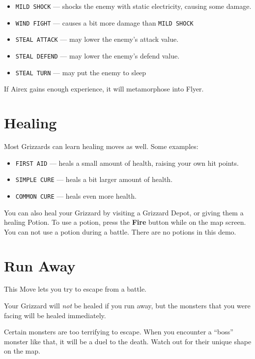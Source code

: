 \documentclass[10pt,twocolumn,openany,article]{memoir}
\begin{document}
\begin{itemize}
\item \texttt{MILD SHOCK} --- shocks  the enemy with static electricity,
  causing some damage.
\item \texttt{WIND FIGHT} --- causes a bit more damage than \texttt{MILD SHOCK}
\item \texttt{STEAL ATTACK} --- may lower the enemy's attack value.
\item \texttt{STEAL DEFEND} --- may lower the enemy's defend value.
\item \texttt{STEAL TURN} --- may put the enemy to sleep
\end{itemize}

If Airex gains enough experience, it will metamorphose into Flyer.

\fi

\section{Healing}

Most Grizzards can learn healing moves as well. Some examples:

\begin{itemize}
\item \texttt{FIRST  AID} ---  heals a small  amount of  health, raising
  your own hit points.
\item \texttt{SIMPLE CURE} --- heals a bit larger amount of health.
\item \texttt{COMMON CURE} --- heals even more health.
\end{itemize}

You can also heal your Grizzard  by visiting a Grizzard Depot, or giving
them a healing  Potion. To use a potion, press  the \textbf{Fire} button
while on  the map  screen. You  can not  use a  potion during  a battle.
\ifdefined\DEMO There are no potions in this demo. \fi

\section{Run Away}

This Move lets you try to escape from a battle.

Your  Grizzard will  \emph{not}  be  healed if  you  run  away, but  the
monsters that you were facing will be healed immediately.

Certain  monsters  are too  terrifying  to  escape. When  you  encounter
a ``boss'' monster like that, it will  be a duel to the death. Watch out
for their unique shape on the map.
\end{document}
